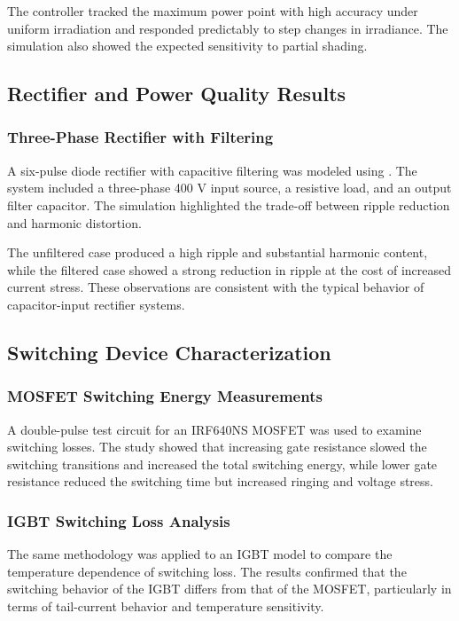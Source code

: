 The controller tracked the maximum power point with high accuracy under uniform irradiation and responded predictably to step changes in irradiance. The simulation also showed the expected sensitivity to partial shading.

\subsection{Rectifier and Power Quality Results}
\subsubsection{Three-Phase Rectifier with Filtering}
A six-pulse diode rectifier with capacitive filtering was modeled using . The system included a three-phase 400 V input source, a resistive load, and an output filter capacitor. The simulation highlighted the trade-off between ripple reduction and harmonic distortion.

The unfiltered case produced a high ripple and substantial harmonic content, while the filtered case showed a strong reduction in ripple at the cost of increased current stress. These observations are consistent with the typical behavior of capacitor-input rectifier systems.

\subsection{Switching Device Characterization}
\subsubsection{MOSFET Switching Energy Measurements}
A double-pulse test circuit for an IRF640NS MOSFET was used to examine switching losses. The study showed that increasing gate resistance slowed the switching transitions and increased the total switching energy, while lower gate resistance reduced the switching time but increased ringing and voltage stress.

\subsubsection{IGBT Switching Loss Analysis}
The same methodology was applied to an IGBT model to compare the temperature dependence of switching loss. The results confirmed that the switching behavior of the IGBT differs from that of the MOSFET, particularly in terms of tail-current behavior and temperature sensitivity.


